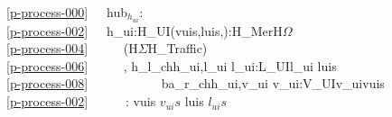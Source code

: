 {
\HHHH
\bp
{}\\
\ref{p-process-000}\ \ \ hub$_{h_{ui}}$: \\
\ref{p-process-002}\ \ \ h\_ui:H\_UI{\TIMES}(vuis,luis,{\UNDERLINE}):H\_Mer{\TIMES}H$\Omega$\\
\ref{p-process-004}\ \ \ \ \ {\RIGHTARROW} (H$\Sigma${\TIMES}H\_Traffic)\\
\ref{p-process-006}\ \ \ \ \ {\RIGHTARROW} , {\LBRACE} h\_l\_ch{\LBRACKET}h\_ui,l\_ui{\RBRACKET} {\BAR} l\_ui:L\_UI{\RDOT}l\_ui {\ISIN} luis {\RBRACE}\\
\ref{p-process-008}\ \ \ \ \ \ \ \ \ \ \ {\LBRACE} ba\_r\_ch{\LBRACKET}h\_ui,v\_ui{\RBRACKET} {\BAR} v\_ui:V\_UI{\RDOT}v\_ui{\ISIN}vuis {\RBRACE} \\
\ref{p-process-002}\ \ \ \ \ \ : vuis {\EQ} $v_{ui}s$ {\WEDGE} luis {\EQ} $l_{ui}s$
\ep
\pos{\psno}{\mnewfoil}


}
